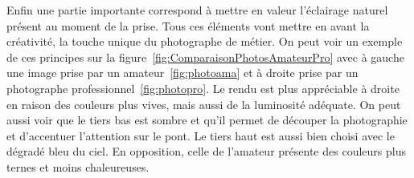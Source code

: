 \documentclass[11pt, french]{report-rd-info}
\begin{document}
Enfin une partie importante correspond à mettre en valeur l'éclairage naturel présent au moment de la prise. Tous ces éléments vont mettre en avant la créativité, la touche unique du photographe de métier.
On peut voir un exemple de ces principes sur la figure~\ref{fig:ComparaisonPhotosAmateurPro} avec à gauche une image prise par un amateur~\ref{fig:photoama} et à droite prise par un photographe professionnel~\ref{fig:photopro}. Le rendu est plus appréciable à droite en raison des couleurs plus vives, mais aussi de la luminosité adéquate. On peut aussi voir que le tiers bas est sombre et qu’il permet de découper la photographie et d’accentuer l’attention sur le pont. Le tiers haut est aussi bien choisi avec le dégradé bleu du ciel. En opposition, celle de l’amateur présente des couleurs plus ternes et moins chaleureuses.
\begin{figure}[htp]
 \centering

\end{figure}
\end{document}

